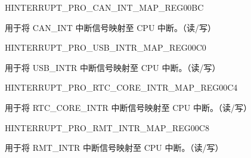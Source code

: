 \begin{register}{H}{INTERRUPT\_PRO\_CAN\_INT\_MAP\_REG}{\hexprefix{}00BC}\label{regdesc:INTERRUPTPROCANINTMAPREG}
%
%
\regnewline%
\begin{regdesc}\begin{reglist}
\label{fielddesc:INTERRUPTPROCANINTMAP}\item [INTERRUPT\_PRO\_CAN\_INT\_MAP] 用于将 CAN\_INT 中断信号映射至 CPU 中断。（读/写）
\end{reglist}\end{regdesc}
\end{register}


\begin{register}{H}{INTERRUPT\_PRO\_USB\_INTR\_MAP\_REG}{\hexprefix{}00C0}\label{regdesc:INTERRUPTPROUSBINTRMAPREG}
%
%
\regnewline%
\begin{regdesc}\begin{reglist}
\label{fielddesc:INTERRUPTPROUSBINTRMAP}\item [INTERRUPT\_PRO\_USB\_INTR\_MAP] 用于将 USB\_INTR 中断信号映射至 CPU 中断。（读/写）
\end{reglist}\end{regdesc}
\end{register}


\begin{register}{H}{INTERRUPT\_PRO\_RTC\_CORE\_INTR\_MAP\_REG}{\hexprefix{}00C4}\label{regdesc:INTERRUPTPRORTCCOREINTRMAPREG}
%
%
\regnewline%
\begin{regdesc}\begin{reglist}
\label{fielddesc:INTERRUPTPRORTCCOREINTRMAP}\item [INTERRUPT\_PRO\_RTC\_CORE\_INTR\_MAP] 用于将 RTC\_CORE\_INTR 中断信号映射至 CPU 中断。（读/写）
\end{reglist}\end{regdesc}
\end{register}


\begin{register}{H}{INTERRUPT\_PRO\_RMT\_INTR\_MAP\_REG}{\hexprefix{}00C8}\label{regdesc:INTERRUPTPRORMTINTRMAPREG}
%
%
\regnewline%
\begin{regdesc}\begin{reglist}
\label{fielddesc:INTERRUPTPRORMTINTRMAP}\item [INTERRUPT\_PRO\_RMT\_INTR\_MAP] 用于将 RMT\_INTR 中断信号映射至 CPU 中断。（读/写）
\end{reglist}\end{regdesc}
\end{register}


